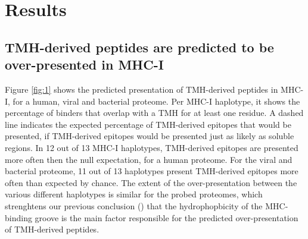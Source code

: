 \section{Results}

\subsection{TMH-derived peptides are predicted to be over-presented in MHC-I}


Figure \ref{fig:1} shows the predicted presentation of TMH-derived peptides in MHC-I,
for a human, viral and bacterial proteome.
Per MHC-I haplotype, it shows the percentage of binders that overlap with a TMH 
for at least one residue.
A dashed line indicates the expected percentage of TMH-derived epitopes 
that would be presented, if TMH-derived epitopes would be presented just as 
likely as soluble regions.
In 12 out of 13 MHC-I haplotypes, TMH-derived epitopes are presented more often 
then the null expectation, for a human proteome. 
For the viral and bacterial proteome, 11 out of 13 haplotypes present
TMH-derived epitopes more often than expected by chance.
The extent of the over-presentation between the various different haplotypes 
is similar for the probed proteomes, which strenghtens our previous conclusion (\cite{bianchi2017}) that the hydrophopbicity of the MHC-binding groove is the main factor responsible for the predicted over-presentation of TMH-derived peptides.  


